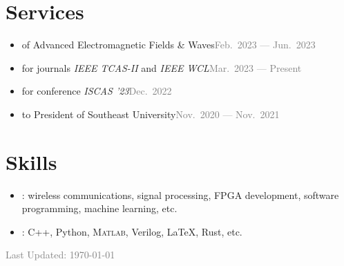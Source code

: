 \documentclass{color-cv}
\begin{document}
\section{Services}
\begin{itemize}
  \item {} of Advanced Electromagnetic Fields \& Waves\hfill\textcolor{gray}{Feb.~2023 --- Jun.~2023}
  \item {} for journals \textit{\color{purple}IEEE TCAS-II} and \textit{\color{purple}IEEE WCL}\hfill\textcolor{gray}{Mar.~2023 --- Present}
  \item {} for conference \textit{\color{purple}ISCAS '23}\hfill\textcolor{gray}{Dec.~2022}
  \item {} to President of Southeast University\hfill\textcolor{gray}{Nov.~2020 --- Nov.~2021}
\end{itemize}

\section{Skills}
\begin{itemize}
  \item {}: wireless communications, signal processing, FPGA development, software programming, machine learning, etc.
  \item {}: C++, Python, \textsc{Matlab}, Verilog, \LaTeX{}, Rust, etc.
\end{itemize}

\vfill\noindent\centering\textcolor{gray}{\small Last Updated: \today{}}
\end{document}
